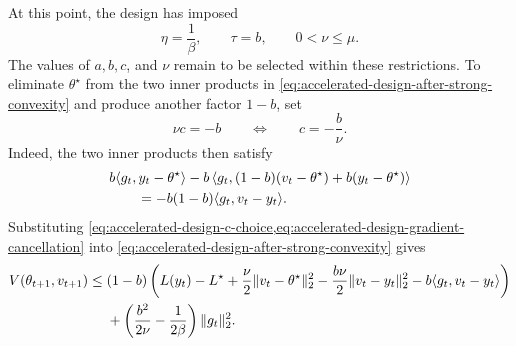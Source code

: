 \documentclass[11pt,twoside]{article}
\theoremstyle{definition}
\theoremstyle{remark}
\begin{document}
At this point, the design has imposed
\begin{equation*}
 \eta=\frac1\beta,
 \qquad
 \tau=b,
 \qquad
 0<\nu\le\mu.
\end{equation*}
The values of $a,b,c$, and $\nu$ remain to be selected within these
restrictions. To eliminate $\theta^\star$ from the two inner products in
\cref{eq:accelerated-design-after-strong-convexity} and produce another factor
$1-b$, set
\begin{equation}
 \nu c=-b
 \qquad\Longleftrightarrow\qquad
 c=-\frac b\nu.
 \label{eq:accelerated-design-c-choice}
\end{equation}
Indeed, the two inner products then satisfy
\begin{align}
 &b\langle g_t,y_t-\theta^\star\rangle
 -b\left\langle g_t,
 (1-b)(v_t-\theta^\star)+b(y_t-\theta^\star)\right\rangle\notag\\
 &\qquad=-b(1-b)\langle g_t,v_t-y_t\rangle.
 \label{eq:accelerated-design-gradient-cancellation}
\end{align}
Substituting \cref{eq:accelerated-design-c-choice,eq:accelerated-design-gradient-cancellation}
into \cref{eq:accelerated-design-after-strong-convexity} gives
\begin{align}
 V(\theta_{t+1},v_{t+1})
 \le{}&(1-b)\left(
 L(y_t)-L^\star+\frac\nu2\|v_t-\theta^\star\|_2^2
 -\frac{b\nu}{2}\|v_t-y_t\|_2^2
 -b\langle g_t,v_t-y_t\rangle\right)\notag\\
 &+\left(\frac{b^2}{2\nu}-\frac1{2\beta}\right)\|g_t\|_2^2.
 \label{eq:accelerated-design-general-bound}
\end{align}
\end{document}
